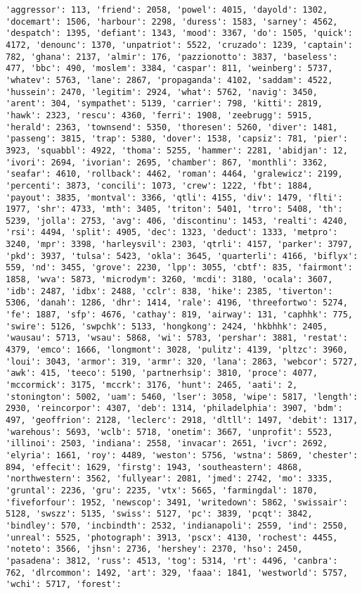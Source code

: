 \documentclass[11pt]{article}
\begin{document}
\begin{Verbatim}[commandchars=\\\{\}]
'aggressor': 113, 'friend': 2058, 'powel': 4015, 'dayold': 1302, 'docemart': 1506, 'harbour': 2298, 'duress': 1583, 'sarney': 4562, 'despatch': 1395, 'defiant': 1343, 'mood': 3367, 'do': 1505, 'quick': 4172, 'denounc': 1370, 'unpatriot': 5522, 'cruzado': 1239, 'captain': 782, 'ghana': 2137, 'almir': 176, 'pazzionotto': 3837, 'baseless': 477, 'bbc': 490, 'moslem': 3384, 'caspar': 811, 'weinberg': 5737, 'whatev': 5763, 'lane': 2867, 'propaganda': 4102, 'saddam': 4522, 'hussein': 2470, 'legitim': 2924, 'what': 5762, 'navig': 3450, 'arent': 304, 'sympathet': 5139, 'carrier': 798, 'kitti': 2819, 'hawk': 2323, 'rescu': 4360, 'ferri': 1908, 'zeebrugg': 5915, 'herald': 2363, 'townsend': 5350, 'thoresen': 5260, 'diver': 1481, 'passeng': 3815, 'trap': 5380, 'dover': 1538, 'capsiz': 781, 'pier': 3923, 'squabbl': 4922, 'thoma': 5255, 'hammer': 2281, 'abidjan': 12, 'ivori': 2694, 'ivorian': 2695, 'chamber': 867, 'monthli': 3362, 'seafar': 4610, 'rollback': 4462, 'roman': 4464, 'gralewicz': 2199, 'percenti': 3873, 'concili': 1073, 'crew': 1222, 'fbt': 1884, 'payout': 3835, 'montval': 3366, 'qtli': 4155, 'div': 1479, 'flti': 1977, 'shr': 4733, 'mth': 3405, 'triton': 5401, 'trro': 5408, 'th': 5239, 'jolla': 2753, 'avg': 406, 'discontinu': 1453, 'realti': 4240, 'rsi': 4494, 'split': 4905, 'dec': 1323, 'deduct': 1333, 'metpro': 3240, 'mpr': 3398, 'harleysvil': 2303, 'qtrli': 4157, 'parker': 3797, 'pkd': 3937, 'tulsa': 5423, 'okla': 3645, 'quarterli': 4166, 'biflyx': 559, 'nd': 3455, 'grove': 2230, 'lpp': 3055, 'cbtf': 835, 'fairmont': 1858, 'wva': 5873, 'microdym': 3260, 'mcdi': 3180, 'ocala': 3607, 'idb': 2487, 'idbx': 2488, 'cclr': 838, 'hike': 2385, 'tiverton': 5306, 'danah': 1286, 'dhr': 1414, 'rale': 4196, 'threefortwo': 5274, 'fe': 1887, 'sfp': 4676, 'cathay': 819, 'airway': 131, 'caphhk': 775, 'swire': 5126, 'swpchk': 5133, 'hongkong': 2424, 'hkbhhk': 2405, 'wausau': 5713, 'wsau': 5868, 'wi': 5783, 'pershar': 3881, 'restat': 4379, 'emco': 1666, 'longmont': 3028, 'pulitz': 4139, 'pltzc': 3960, 'loui': 3043, 'armor': 319, 'armr': 320, 'lana': 2863, 'webcor': 5727, 'awk': 415, 'teeco': 5190, 'partnerhsip': 3810, 'proce': 4077, 'mccormick': 3175, 'mccrk': 3176, 'hunt': 2465, 'aati': 2, 'stonington': 5002, 'uam': 5460, 'lser': 3058, 'wipe': 5817, 'length': 2930, 'reincorpor': 4307, 'deb': 1314, 'philadelphia': 3907, 'bdm': 497, 'geoffrion': 2128, 'leclerc': 2918, 'dltll': 1497, 'debit': 1317, 'warehous': 5693, 'wclb': 5718, 'onetim': 3667, 'unprofit': 5523, 'illinoi': 2503, 'indiana': 2558, 'invacar': 2651, 'ivcr': 2692, 'elyria': 1661, 'roy': 4489, 'weston': 5756, 'wstna': 5869, 'chester': 894, 'effecit': 1629, 'firstg': 1943, 'southeastern': 4868, 'northwestern': 3562, 'fullyear': 2081, 'jmed': 2742, 'mo': 3335, 'gruntal': 2236, 'gru': 2235, 'vtx': 5665, 'farmingdal': 1870, 'fiveforfour': 1952, 'newscop': 3491, 'writedown': 5862, 'swissair': 5128, 'swszz': 5135, 'swiss': 5127, 'pc': 3839, 'pcqt': 3842, 'bindley': 570, 'incbindth': 2532, 'indianapoli': 2559, 'ind': 2550, 'unreal': 5525, 'photograph': 3913, 'pscx': 4130, 'rochest': 4455, 'noteto': 3566, 'jhsn': 2736, 'hershey': 2370, 'hso': 2450, 'pasadena': 3812, 'russ': 4513, 'tog': 5314, 'rt': 4496, 'canbra': 762, 'dlrcommon': 1492, 'art': 329, 'faaa': 1841, 'westworld': 5757, 'wchi': 5717, 'forest': 
\end{Verbatim}
\end{document}
